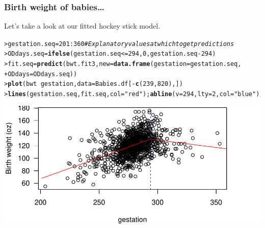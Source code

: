 \documentclass{beamer}\usepackage[]{graphicx}\usepackage[]{xcolor}
\makeatletter
\def\maxwidth{ %
  \ifdim\Gin@nat@width>\linewidth
    \linewidth
  \else
    \Gin@nat@width
  \fi
}
\newcommand{\hlnum}[1]{\textcolor[rgb]{0.686,0.059,0.569}{#1}}%
\newcommand{\hlstr}[1]{\textcolor[rgb]{0.192,0.494,0.8}{#1}}%
\newcommand{\hlcom}[1]{\textcolor[rgb]{0.678,0.584,0.686}{\textit{#1}}}%
\newcommand{\hlopt}[1]{\textcolor[rgb]{0,0,0}{#1}}%
\newcommand{\hlstd}[1]{\textcolor[rgb]{0.345,0.345,0.345}{#1}}%
\newcommand{\hlkwb}[1]{\textcolor[rgb]{0.69,0.353,0.396}{#1}}%
\newcommand{\hlkwc}[1]{\textcolor[rgb]{0.333,0.667,0.333}{#1}}%
\newcommand{\hlkwd}[1]{\textcolor[rgb]{0.737,0.353,0.396}{\textbf{#1}}}%
\newenvironment{kframe}{%
 \def\at@end@of@kframe{}%
 \ifinner\ifhmode%
  \def\at@end@of@kframe{\end{minipage}}%
  \begin{minipage}{\columnwidth}%
 \fi\fi%
 \def\FrameCommand##1{\hskip\@totalleftmargin \hskip-\fboxsep
 \colorbox{shadecolor}{##1}\hskip-\fboxsep
     \hskip-\linewidth \hskip-\@totalleftmargin \hskip\columnwidth}%
 \MakeFramed {\advance\hsize-\width
   \@totalleftmargin\z@ \linewidth\hsize
   \@setminipage}}%
 {\par\unskip\endMakeFramed%
 \at@end@of@kframe}
\newenvironment{knitrout}{}{} %
\makeatother
\begin{document}
\begin{frame}[fragile]
\frametitle{Birth weight of babies\ldots}
Let's take a look at our fitted hockey stick model.

\begin{knitrout}\scriptsize
{}\color{fgcolor}\begin{kframe}
\begin{alltt}
\hlstd{> }\hlstd{gestation.seq}\hlkwb{=}\hlnum{201}\hlopt{:}\hlnum{360} \hlcom{#Explanatory values at which to get predictions}
\hlstd{> }\hlstd{ODdays.seq}\hlkwb{=}\hlkwd{ifelse}\hlstd{(gestation.seq}\hlopt{<=}\hlnum{294}\hlstd{,}\hlnum{0}\hlstd{,gestation.seq}\hlopt{-}\hlnum{294}\hlstd{)}
\hlstd{> }\hlstd{fit.seq}\hlkwb{=}\hlkwd{predict}\hlstd{(bwt.fit3,}\hlkwc{new}\hlstd{=}\hlkwd{data.frame}\hlstd{(}\hlkwc{gestation}\hlstd{=gestation.seq,}
\hlstd{+ }                                        \hlkwc{ODdays}\hlstd{=ODdays.seq))}
\hlstd{> }\hlkwd{plot}\hlstd{(bwt}\hlopt{~}\hlstd{gestation,}\hlkwc{data}\hlstd{=Babies.df[}\hlopt{-}\hlkwd{c}\hlstd{(}\hlnum{239}\hlstd{,} \hlnum{820}\hlstd{),])}
\hlstd{> }\hlkwd{lines}\hlstd{(gestation.seq,fit.seq,}\hlkwc{col}\hlstd{=}\hlstr{"red"}\hlstd{);} \hlkwd{abline}\hlstd{(}\hlkwc{v}\hlstd{=}\hlnum{294}\hlstd{,}\hlkwc{lty}\hlstd{=}\hlnum{2}\hlstd{,}\hlkwc{col}\hlstd{=}\hlstr{"blue"}\hlstd{)}
\end{alltt}
\end{kframe}
\includegraphics[width=\maxwidth]{figure/RC-H10-030_5-1} 
\end{knitrout}
\end{frame}
\end{document}
